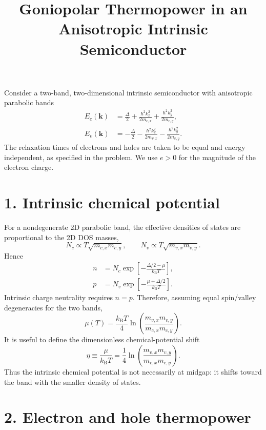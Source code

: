\documentclass[11pt]{article}
\title{\vspace{-1.2cm}Goniopolar Thermopower in an Anisotropic Intrinsic Semiconductor}
\author{}
\date{}
\newcommand{\kb}{k_{\mathrm B}}
\begin{document}
\maketitle
\vspace{-0.9cm}

Consider a two-band, two-dimensional intrinsic semiconductor with anisotropic parabolic bands
\begin{align}
E_c(\mathbf{k})
&=\frac{\Delta}{2}
+\frac{\hbar^2k_x^2}{2m_{c,x}}
+\frac{\hbar^2k_y^2}{2m_{c,y}},\\
E_v(\mathbf{k})
&=-\frac{\Delta}{2}
-\frac{\hbar^2k_x^2}{2m_{v,x}}
-\frac{\hbar^2k_y^2}{2m_{v,y}}.
\end{align}
The relaxation times of electrons and holes are taken to be equal and energy independent, as specified in the problem. We use $e>0$ for the magnitude of the electron charge.

\section*{1. Intrinsic chemical potential}

For a nondegenerate 2D parabolic band, the effective densities of states are proportional to the 2D DOS masses,
\begin{equation}
N_c\propto T\sqrt{m_{c,x}m_{c,y}},
\qquad
N_v\propto T\sqrt{m_{v,x}m_{v,y}}.
\end{equation}
Hence
\begin{align}
n&=N_c\exp\!\left[-\frac{\Delta/2-\mu}{\kb T}\right],\\
p&=N_v\exp\!\left[-\frac{\mu+\Delta/2}{\kb T}\right].
\end{align}
Intrinsic charge neutrality requires $n=p$. Therefore, assuming equal spin/valley degeneracies for the two bands,
\begin{equation}
\boxed{
\mu(T)=\frac{\kb T}{4}
\ln\!\left(
\frac{m_{v,x}m_{v,y}}
     {m_{c,x}m_{c,y}}
\right).
}
\label{eq:mu}
\end{equation}
It is useful to define the dimensionless chemical-potential shift
\begin{equation}
\eta\equiv\frac{\mu}{\kb T}
=\frac14\ln\!\left(
\frac{m_{v,x}m_{v,y}}
     {m_{c,x}m_{c,y}}
\right).
\label{eq:eta}
\end{equation}
Thus the intrinsic chemical potential is not necessarily at midgap: it shifts toward the band with the smaller density of states.

\section*{2. Electron and hole thermopower}
\end{document}
